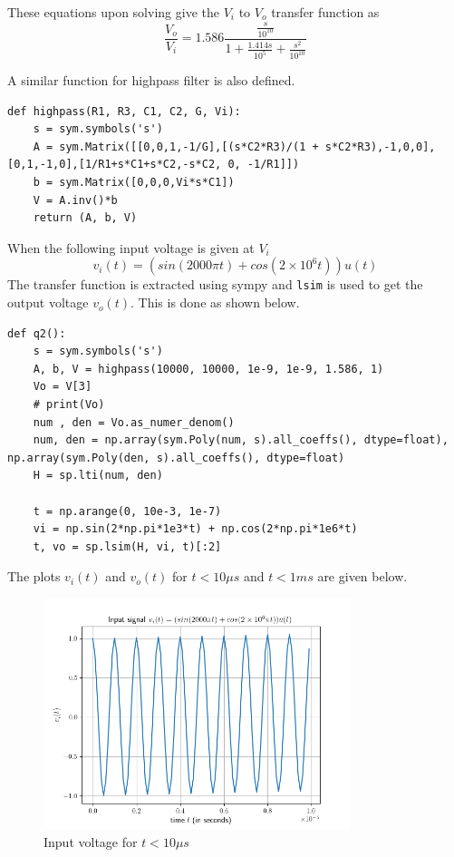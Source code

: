 \documentclass[12pt, a4paper]{article}
\begin{document}
These equations upon solving give the $V_i$ to $V_o$ transfer function as
\begin{equation*}
\frac{V_o}{V_i} = 1.586\frac{\frac{s}{10^{10}}}{1 + \frac{1.414s}{10^5} + \frac{s^2}{10^{10}}}
\end{equation*}

A similar function for highpass filter is also defined.

\begin{lstlisting}
def highpass(R1, R3, C1, C2, G, Vi):
    s = sym.symbols('s')
    A = sym.Matrix([[0,0,1,-1/G],[(s*C2*R3)/(1 + s*C2*R3),-1,0,0],[0,1,-1,0],[1/R1+s*C1+s*C2,-s*C2, 0, -1/R1]])
    b = sym.Matrix([0,0,0,Vi*s*C1])
    V = A.inv()*b
    return (A, b, V)
\end{lstlisting}

When the following input voltage is given at $V_i$
\begin{equation*}
v_i(t) = (sin(2000\pi t) + cos(2 \times 10^6 t))u(t)
\end{equation*}
The transfer function is extracted using sympy and \texttt{lsim} is used to get the output voltage $v_o(t)$. This is done as shown below.

\begin{lstlisting}
def q2():
    s = sym.symbols('s')
    A, b, V = highpass(10000, 10000, 1e-9, 1e-9, 1.586, 1)
    Vo = V[3]
    # print(Vo)
    num , den = Vo.as_numer_denom()
    num, den = np.array(sym.Poly(num, s).all_coeffs(), dtype=float), np.array(sym.Poly(den, s).all_coeffs(), dtype=float)
    H = sp.lti(num, den)

    t = np.arange(0, 10e-3, 1e-7)
    vi = np.sin(2*np.pi*1e3*t) + np.cos(2*np.pi*1e6*t)
    t, vo = sp.lsim(H, vi, t)[:2]
\end{lstlisting}

The plots $v_i(t)$ and $v_o(t)$ for $t < 10\mu s$ and $t < 1ms$ are given below.

\begin{figure}[H]
\centering
\includegraphics[width=0.8\textwidth]{q2Input1.png}
\caption{Input voltage for $t < 10\mu s$}
\end{figure}
\end{document}
